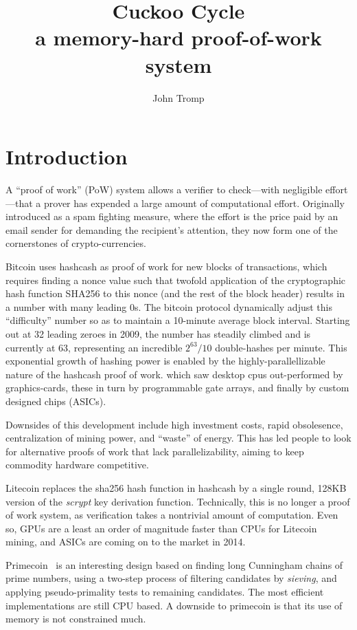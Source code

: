 \documentclass[11pt, oneside]{article}
\title{Cuckoo Cycle \protect\\ a memory-hard proof-of-work system}
\author{John Tromp}
\begin{document}
\maketitle
\section{Introduction}
A ``proof of work'' (PoW) system allows a verifier to check---with
negligible effort---that a prover has expended a large amount of computational effort.
Originally introduced as a spam fighting measure, 
where the effort is the price paid by an email sender for demanding the recipient's attention,
they now form one of the cornerstones of crypto-currencies.

Bitcoin\cite{nakamoto2009bitcoin} uses hashcash\cite{back2002} as proof of work for
new blocks of transactions, which requires finding a nonce value such that
twofold application of the cryptographic hash function SHA256
to this nonce (and the rest of the block header) results in a number with many
leading 0s.  The bitcoin protocol dynamically adjust this ``difficulty'' number
so as to maintain a 10-minute average block interval. Starting out at 32 leading zeroes in 2009,
the number has steadily climbed and is currently at 63, representing
an incredible $2^{63}/10$ double-hashes per minute. This exponential growth of hashing power
is enabled by the highly-parallellizable nature of the hashcash proof of work.
which saw desktop cpus out-performed by graphics-cards,
these in turn by programmable gate arrays, and finally by custom designed chips (ASICs).

Downsides of this development include high investment costs, rapid obsolesence, centralization
of mining power, and ``waste'' of energy.
This has led people to look for alternative proofs of work that lack parallelizability,
aiming to keep commodity hardware competitive.

Litecoin replaces the sha256 hash function in hashcash by a single round, 128KB version of the
{\em scrypt} key derivation function. Technically, this is no longer a proof of work system, as
verification takes a nontrivial amount of computation. Even so, GPUs are a least an order
of magnitude faster than CPUs for Litecoin mining, and ASICs are coming on to the market in 2014.

Primecoin~\cite{king2013} is an interesting design based on finding long Cunningham chains
of prime numbers, using a two-step process of filtering candidates by {\em sieving}, and applying
pseudo-primality tests to remaining candidates. The most efficient implementations are still CPU based.
A downside to primecoin is that its use of memory is not constrained much.
\end{document}
